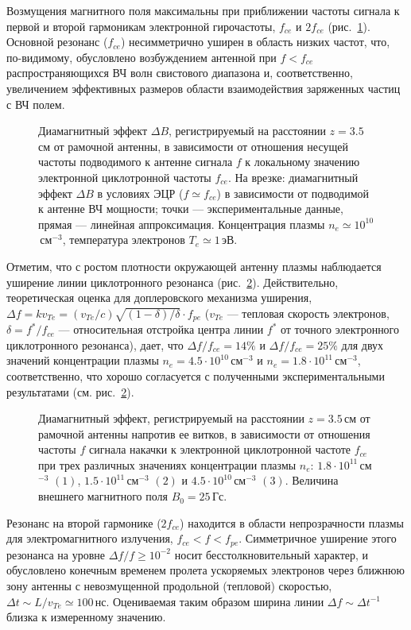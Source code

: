 \documentclass[10pt]{disser}
\begin{document}
Возмущения магнитного поля максимальны при приближении частоты сигнала к первой   и второй   гармоникам электронной гирочастоты, $f_{ce}$ и $2f_{ce}$ (\mbox{рис.~\ref{fig:cycl_line}}). Основной резонанс ($f_{ce}$) несимметрично уширен в область низких частот, что, по-видимому, обусловлено возбуждением антенной при $f<f_{ce}$ распространяющихся ВЧ волн свистового диапазона и, соответственно, увеличением эффективных размеров области взаимодействия заряженных частиц с ВЧ полем. 
\begin{figure}[H]
    \centering
    \def\svgwidth{0.6\columnwidth} %
    
    \caption{Диамагнитный эффект $\Delta{}B$, регистрируемый на расстоянии $z=3.5$\,см от рамочной антенны, в зависимости от отношения несущей частоты подводимого к антенне сигнала $f$ к локальному значению электронной циклотронной частоты $f_{ce}$. На врезке: диамагнитный эффект $\Delta{}B$ в условиях ЭЦР ($f\simeq f_{ce}$) в зависимости от подводимой к антенне ВЧ мощности; точки --- экспериментальные данные, прямая --- линейная аппроксимация. Концентрация плазмы $n_{e}\simeq 10^{10}$\,см$^{-3}$, температура электронов $T_e\simeq 1$\,эВ.}
    \label{fig:cycl_line}
\end{figure}
Отметим, что с ростом плотности окружающей антенну плазмы наблюдается уширение линии циклотронного резонанса (\mbox{рис.~\ref{fig:cyclotrone_lines}}). Действительно, теоретическая оценка для доплеровского механизма уширения, $\Delta{}f=kv_{Te}=(v_{Te}/c)\sqrt{(1-\delta{})/\delta{}}\cdot{}f_{pe}$ ($v_{Te}$ --- тепловая скорость электронов, $\delta{}=f^{*}/f_{ce}$ --- относительная отстройка центра линии $f^{*}$  от точного электронного циклотронного резонанса), дает, что $\Delta{}f/{}f_{ce} = 14\%$ и $\Delta{}f/f_{ce} = 25\%$ для двух значений концентрации плазмы $n_{e}=4.5\cdot{}10^{10}$\,см$^{-3}$ и $n_{e}=1.8\cdot{}10^{11}$\,см$^{-3}$, соответственно, что хорошо согласуется с полученными экспериментальными результатами  (см. \mbox{рис.~\ref{fig:cyclotrone_lines}}).
\begin{figure}[H]
    \centering
    \def\svgwidth{0.6\columnwidth} %
    
    \caption{Диамагнитный эффект, регистрируемый на расстоянии $z=3.5$\,см от рамочной антенны напротив ее витков, в зависимости от отношения частоты $f$ сигнала накачки к электронной циклотронной частоте $f_{ce}$ при трех различных значениях концентрации плазмы $n_{e}$: $1.8\cdot{}10^{11}$\,см$^{-3}$ $(1)$, $1.5\cdot{}10^{11}$\,см$^{-3}$ $(2)$ и $4.5\cdot{}10^{10}$\,см$^{-3}$ $(3)$. Величина внешнего магнитного поля $B_{0}=25$\,Гс.}
    \label{fig:cyclotrone_lines}
\end{figure}
Резонанс на второй гармонике ($2f_{ce}$) находится в области непрозрачности плазмы для электромагнитного излучения, $f_{ce}<f<f_{pe}$. Симметричное уширение этого резонанса на уровне $\Delta f/f\ge 10^{-2}$ носит бесстолкновительный характер, и обусловлено конечным временем пролета ускоряемых электронов через ближнюю зону антенны с невозмущенной продольной (тепловой) скоростью, $\Delta t\sim L/v_{Te}\simeq 100$\,нс. Оцениваемая таким образом ширина линии $\Delta f \sim \Delta t^{-1}$ близка к измеренному значению. 
\end{document}

